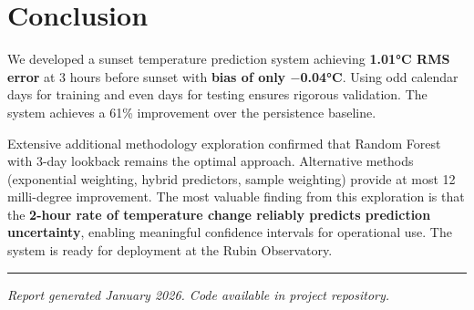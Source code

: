 \documentclass[11pt,letterpaper]{article}
\begin{document}
\section{Conclusion}

We developed a sunset temperature prediction system achieving \textbf{1.01°C RMS error} at 3 hours before sunset with \textbf{bias of only $-$0.04°C}. Using odd calendar days for training and even days for testing ensures rigorous validation. The system achieves a 61\% improvement over the persistence baseline.

Extensive additional methodology exploration confirmed that Random Forest with 3-day lookback remains the optimal approach. Alternative methods (exponential weighting, hybrid predictors, sample weighting) provide at most 12 milli-degree improvement. The most valuable finding from this exploration is that the \textbf{2-hour rate of temperature change reliably predicts prediction uncertainty}, enabling meaningful confidence intervals for operational use. The system is ready for deployment at the Rubin Observatory.

\vspace{1em}
\hrule
\vspace{0.5em}
\small
\textit{Report generated January 2026. Code available in project repository.}
\end{document}
